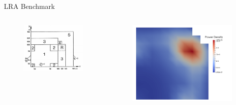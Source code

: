 \documentclass[8pt,xcolor=dvipnames]{beamer}
\begin{document}
\begin{frame}{LRA Benchmark}
\begin{columns}

\begin{figure}
\includegraphics[width=\linewidth]{figures/lra.png}
\end{figure}

\begin{figure}
\includegraphics[width=\linewidth]{figures/lra_profile2D.png}
\end{figure}

\end{columns}
\end{frame}
\end{document}
